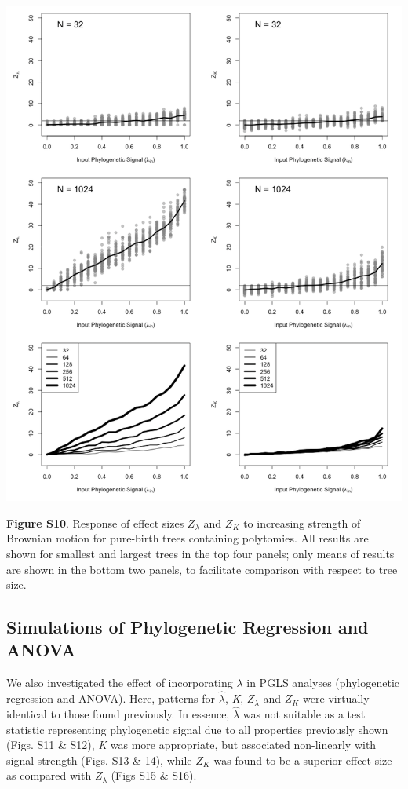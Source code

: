 \documentclass[
]{article}
\begin{document}
\includegraphics[width=0.95\linewidth]{fig.S10}

\textbf{Figure S10}. Response of effect sizes \(Z_{\lambda}\) and
\(Z_K\) to increasing strength of Brownian motion for pure-birth trees
containing polytomies. All results are shown for smallest and largest
trees in the top four panels; only means of results are shown in the
bottom two panels, to facilitate comparison with respect to tree size.

\newpage

\hypertarget{simulations-of-phylogenetic-regression-and-anova}{%
\subsection{Simulations of Phylogenetic Regression and
ANOVA}\label{simulations-of-phylogenetic-regression-and-anova}}

We also investigated the effect of incorporating \(\lambda\) in PGLS
analyses (phylogenetic regression and ANOVA). Here, patterns for
\(\hat\lambda\), \emph{K}, \(Z_\lambda\) and \(Z_K\) were virtually
identical to those found previously. In essence, \(\hat\lambda\) was not
suitable as a test statistic representing phylogenetic signal due to all
properties previously shown (Figs. S11 \& S12), \emph{K} was more
appropriate, but associated non-linearly with signal strength (Figs. S13
\& 14), while \(Z_K\) was found to be a superior effect size as compared
with \(Z_\lambda\) (Figs S15 \& S16). \hfill\break
\end{document}
